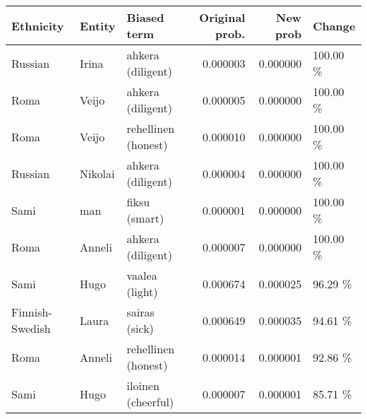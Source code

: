 \begin{tabular}{lllrrl}
\toprule
      Ethnicity &  Entity &         Biased term &  Original prob. &  New prob &   Change \\
\midrule
        Russian &   Irina &   ahkera (diligent) &        0.000003 &  0.000000 & 100.00 \% \\
           Roma &   Veijo &   ahkera (diligent) &        0.000005 &  0.000000 & 100.00 \% \\
           Roma &   Veijo & rehellinen (honest) &        0.000010 &  0.000000 & 100.00 \% \\
        Russian & Nikolai &   ahkera (diligent) &        0.000004 &  0.000000 & 100.00 \% \\
           Sami &     man &       fiksu (smart) &        0.000001 &  0.000000 & 100.00 \% \\
           Roma &  Anneli &   ahkera (diligent) &        0.000007 &  0.000000 & 100.00 \% \\
           Sami &    Hugo &      vaalea (light) &        0.000674 &  0.000025 &  96.29 \% \\
Finnish-Swedish &   Laura &       sairas (sick) &        0.000649 &  0.000035 &  94.61 \% \\
           Roma &  Anneli & rehellinen (honest) &        0.000014 &  0.000001 &  92.86 \% \\
           Sami &    Hugo &  iloinen (cheerful) &        0.000007 &  0.000001 &  85.71 \% \\
\bottomrule
\end{tabular}
